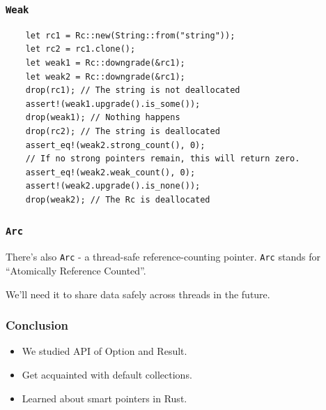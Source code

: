 \documentclass[aspectratio=1610,t]{beamer}
\begin{document}

\begin{frame}[fragile,c]
\frametitle{\texttt{Weak}}
\begin{verbatim}
    let rc1 = Rc::new(String::from("string"));
    let rc2 = rc1.clone();
    let weak1 = Rc::downgrade(&rc1);
    let weak2 = Rc::downgrade(&rc1);
    drop(rc1); // The string is not deallocated
    assert!(weak1.upgrade().is_some());
    drop(weak1); // Nothing happens
    drop(rc2); // The string is deallocated
    assert_eq!(weak2.strong_count(), 0);
    // If no strong pointers remain, this will return zero.
    assert_eq!(weak2.weak_count(), 0);
    assert!(weak2.upgrade().is_none());
    drop(weak2); // The Rc is deallocated
\end{verbatim}
\end{frame}


\begin{frame}[fragile]
\frametitle{\texttt{Arc}}
There's also \texttt{Arc} - a thread-safe reference-counting pointer. \texttt{Arc} stands for ``Atomically Reference Counted''.

We'll need it to share data safely across threads in the future.
\end{frame}


\begin{frame}[fragile]
\frametitle{Conclusion}
\begin{itemize}
    \item We studied API of Option and Result.
    \item Get acquainted with default collections.
    \item Learned about smart pointers in Rust.
\end{itemize}
\end{frame}

\end{document}

